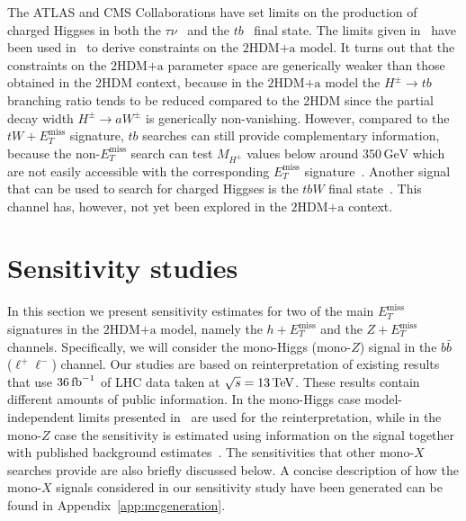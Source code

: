 \documentclass[review]{elsarticle}
\newcommand{\MET}{\ensuremath{E_T^\mathrm{miss}}\xspace}
\newcommand{\mHc}{\ensuremath{M_{H^{\pm}}}\xspace}
\newcommand{\hdma}{\ensuremath{\textrm{2HDM+a}}\xspace}
\begin{document}
The ATLAS and CMS Collaborations have set limits on the production of charged Higgses in both the $\tau \nu$~\cite{Aaboud:2016dig,CMS-PAS-HIG-16-031} and the $tb$~\cite{Aad:2015typ,Khachatryan:2015qxa,ATLAS:2016qiq} final state. The limits given in~\cite{ATLAS:2016qiq} have been used in~\cite{Pani:2017qyd} to derive constraints on the \hdma model. It turns out that  the constraints on the \hdma parameter space are generically weaker than those obtained in the 2HDM context, because in the \hdma model  the $H^\pm \to tb$ branching ratio tends to be reduced compared to the 2HDM since the partial decay width $H^\pm \to aW^\pm$ is generically non-vanishing.  However, compared to the $tW+\MET$ signature, $tb$ searches can still provide complementary information, because the non-$\MET$  search can test $\mHc$ values below around $350 \, {\mathrm{GeV}}$ which are not easily accessible with the corresponding $\MET$ signature~\cite{Pani:2017qyd}. Another signal that can be used to search for charged Higgses is the $tbW$ final state~\cite{Haisch:2018djm}. This channel has, however, not yet been explored in the \hdma context. 


\section{Sensitivity studies}
\label{sec:sensitivitystudies}

In this section we present sensitivity estimates for two of the main $\MET$ signatures in the \hdma model, namely the $h +\MET$  and the $Z+\MET$ channels. Specifically, we will consider the mono-Higgs (mono-$Z$) signal in the $b \bar b$ ($\ell^+ \ell^-$) channel.  Our studies are based on reinterpretation of existing results that use $36 \, {\rm fb}^{-1}$ of LHC data taken at $\sqrt{s} = 13 \, {\rm TeV}$. These results contain different amounts of public information. In the mono-Higgs case model-independent limits presented in~\cite{Aaboud:2017yqz} are used for the reinterpretation, while in the mono-$Z$ case  the sensitivity is estimated using information on the signal together with published background estimates~\cite{Aaboud:2017bja}.  The sensitivities that other mono-$X$ searches provide are also briefly discussed below.  A concise description of how the  mono-$X$ signals considered in our sensitivity study have been generated  can be found in Appendix~\ref{app:mcgeneration}.
\end{document}

